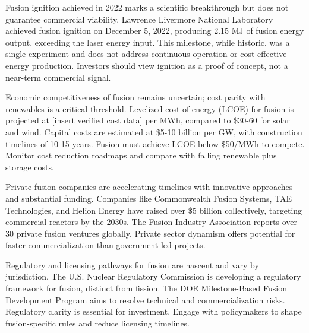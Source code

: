 \documentclass[10pt,a4paper]{article}
\begin{document}
\begin{minipage}[t]{0.46\linewidth}
{\small Fusion ignition achieved in 2022 marks a scientific breakthrough but does not guarantee commercial viability. Lawrence Livermore National Laboratory achieved fusion ignition on December 5, 2022, producing 2.15 MJ of fusion energy output, exceeding the laser energy input. This milestone, while historic, was a single experiment and does not address continuous operation or cost-effective energy production. Investors should view ignition as a proof of concept, not a near-term commercial signal.}\par
{\small Economic competitiveness of fusion remains uncertain; cost parity with renewables is a critical threshold. Levelized cost of energy (LCOE) for fusion is projected at [insert verified cost data] per MWh, compared to \$30-60 for solar and wind. Capital costs are estimated at \$5-10 billion per GW, with construction timelines of 10-15 years. Fusion must achieve LCOE below \$50/MWh to compete. Monitor cost reduction roadmaps and compare with falling renewable plus storage costs.}\par
\end{minipage}\hfill\begin{minipage}[t]{0.46\linewidth}
{\small Private fusion companies are accelerating timelines with innovative approaches and substantial funding. Companies like Commonwealth Fusion Systems, TAE Technologies, and Helion Energy have raised over \$5 billion collectively, targeting commercial reactors by the 2030s. The Fusion Industry Association reports over 30 private fusion ventures globally. Private sector dynamism offers potential for faster commercialization than government-led projects.}\par
{\small Regulatory and licensing pathways for fusion are nascent and vary by jurisdiction. The U.S. Nuclear Regulatory Commission is developing a regulatory framework for fusion, distinct from fission. The DOE Milestone-Based Fusion Development Program aims to resolve technical and commercialization risks. Regulatory clarity is essential for investment. Engage with policymakers to shape fusion-specific rules and reduce licensing timelines.}\par
\end{minipage}
\end{document}
